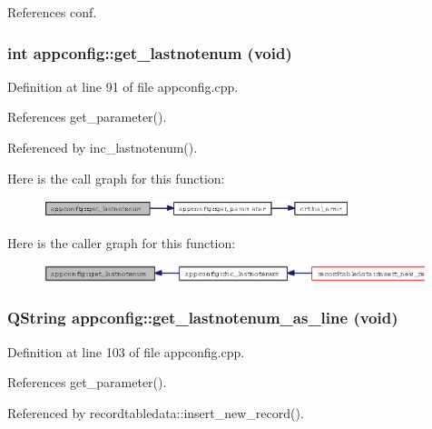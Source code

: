 References conf.
\subsubsection{\setlength{\rightskip}{0pt plus 5cm}int appconfig::get\_\-lastnotenum (void)}\label{classappconfig_0291790bcb173b674f70950181f70545}




Definition at line 91 of file appconfig.cpp.

References get\_\-parameter().

Referenced by inc\_\-lastnotenum().

Here is the call graph for this function:\begin{figure}[H]
\begin{center}
\leavevmode
\includegraphics[width=253pt]{classappconfig_0291790bcb173b674f70950181f70545_cgraph}
\end{center}
\end{figure}


Here is the caller graph for this function:\begin{figure}[H]
\begin{center}
\leavevmode
\includegraphics[width=315pt]{classappconfig_0291790bcb173b674f70950181f70545_icgraph}
\end{center}
\end{figure}
\subsubsection{\setlength{\rightskip}{0pt plus 5cm}QString appconfig::get\_\-lastnotenum\_\-as\_\-line (void)}\label{classappconfig_2a324f08a97ea456e79d59fe16877000}




Definition at line 103 of file appconfig.cpp.

References get\_\-parameter().

Referenced by recordtabledata::insert\_\-new\_\-record().

